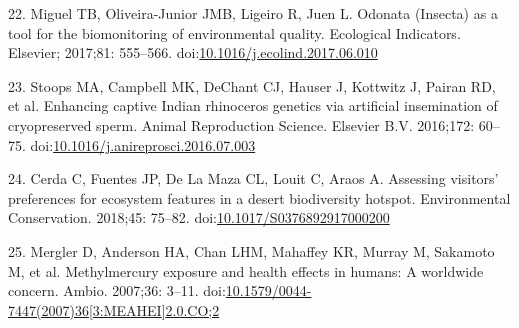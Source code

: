 \documentclass[10pt,letterpaper]{article}
\begin{document}
\hypertarget{ref-Miguel2017}{}
22. Miguel TB, Oliveira-Junior JMB, Ligeiro R, Juen L. Odonata (Insecta)
as a tool for the biomonitoring of environmental quality. Ecological
Indicators. Elsevier; 2017;81: 555--566.
doi:\href{https://doi.org/10.1016/j.ecolind.2017.06.010}{10.1016/j.ecolind.2017.06.010}

\hypertarget{ref-Stoops2016}{}
23. Stoops MA, Campbell MK, DeChant CJ, Hauser J, Kottwitz J, Pairan RD,
et al. Enhancing captive Indian rhinoceros genetics via artificial
insemination of cryopreserved sperm. Animal Reproduction Science.
Elsevier B.V. 2016;172: 60--75.
doi:\href{https://doi.org/10.1016/j.anireprosci.2016.07.003}{10.1016/j.anireprosci.2016.07.003}

\hypertarget{ref-Cerda2018}{}
24. Cerda C, Fuentes JP, De La Maza CL, Louit C, Araos A. Assessing
visitors' preferences for ecosystem features in a desert biodiversity
hotspot. Environmental Conservation. 2018;45: 75--82.
doi:\href{https://doi.org/10.1017/S0376892917000200}{10.1017/S0376892917000200}

\hypertarget{ref-Mergler2007}{}
25. Mergler D, Anderson HA, Chan LHM, Mahaffey KR, Murray M, Sakamoto M,
et al. Methylmercury exposure and health effects in humans: A worldwide
concern. Ambio. 2007;36: 3--11.
doi:\href{https://doi.org/10.1579/0044-7447(2007)36\%5B3:MEAHEI\%5D2.0.CO;2}{10.1579/0044-7447(2007)36{[}3:MEAHEI{]}2.0.CO;2}

\nolinenumbers
\end{document}
